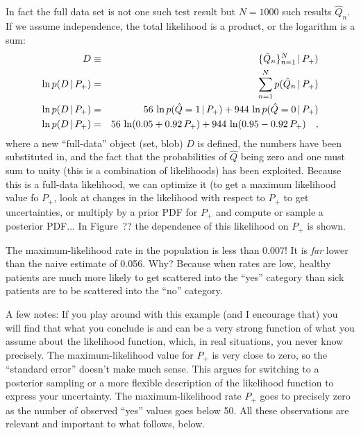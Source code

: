 \documentclass[12pt,twoside]{article}
\begin{document}
In fact the full data set is not one such test result but $N=1000$
such results $\hat{Q}_n$.  If we assume independence, the total
likelihood is a product, or the logarithm is a sum:
\begin{eqnarray}
D &\equiv& \{{\hat{Q}_n}\}_{{n=1}}^{{N}}\,|\, P_+) 
\\
\ln p(D\,|\, P_+) 
 &=& \sum_{n=1}^N p(\hat{Q}_n\,|\, P_+)
\\
\ln p(D\,|\, P_+) 
 &=& 56\,\ln p(\hat{Q}=1\,|\, P_+) + 944\,\ln p(\hat{Q}=0\,|\, P_+)
\\
\ln p(D\,|\, P_+) 
 &=& 56\,\ln (0.05 + 0.92\,P_+) + 944\,\ln (0.95 - 0.92\,P_+)
\quad,
\end{eqnarray}
where a new ``full-data'' object (set, blob) $D$ is defined, the
numbers have been substituted in, and the fact that the probabilities
of $\hat{Q}$ being zero and one must sum to unity (this is a
combination of likelihoods) has been exploited.  Because this is a
full-data likelihood, we can optimize it (to get a maximum likelihood
value fo $P_+$, look at changes in the likelihood with respect to
$P_+$ to get uncertainties, or multiply by a prior PDF for $P_+$ and
compute or sample a posterior PDF... In Figure~?? the dependence of
this likelihood on $P_+$ is shown.

The maximum-likelihood rate in the population is less than 0.007!  It
is \emph{far} lower than the naive estimate of 0.056.  Why?  Because
when rates are low, healthy patients are much more likely to get
scattered into the ``yes'' category than sick patients are to be
scattered into the ``no'' category.

A few notes: If you play around with this example (and I encourage
that) you will find that what you conclude is and can be a very strong
function of what you assume about the likelihood function, which, in
real situations, you never know precisely.  The
maximum-likelihood value for $P_+$ is very close to zero, so the
``standard error'' doesn't make much sense.  This argues for switching
to a posterior sampling or a more flexible description of the
likelihood function to express your uncertainty.  The
maximum-likelihood rate $P_+$ goes to precisely zero as the number of
observed ``yes'' values goes below 50.  All these observations are
relevant and important to what follows, below.
\end{document}
